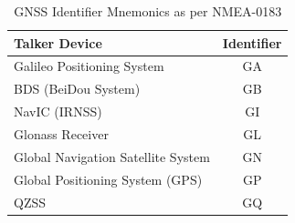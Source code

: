 
\renewcommand{\arraystretch}{1.5}
\begin{table}
    \begin{center}
        \caption{GNSS Identifier Mnemonics as per NMEA-0183}
        \label{tab:NMEA Mnemonics}
        \begin{tabular}{ l|c }
            \hline
            \textbf{Talker Device} & \textbf{Identifier} \\
            \hline
            Galileo Positioning System & GA \\
            BDS (BeiDou System) & GB \\
            NavIC (IRNSS) & GI \\
            Glonass Receiver & GL \\
            Global Navigation Satellite System & GN \\
            Global Positioning System (GPS) & GP \\
            QZSS & GQ \\
            \hline
        \end{tabular}
    \end{center}
\end{table}
\renewcommand{\arraystretch}{1}

